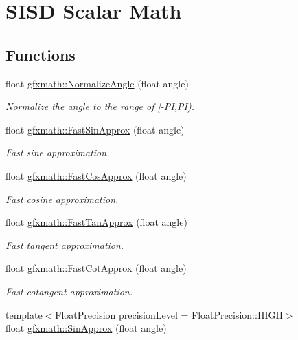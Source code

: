 \hypertarget{group___s_i_s_d_scalar_math}{}\section{S\+I\+S\+D Scalar Math}
\label{group___s_i_s_d_scalar_math}
\subsection*{Functions}
\begin{DoxyCompactItemize}
\item 
float \hyperlink{group___s_i_s_d_scalar_math_ga9ae15ff8e8601f2ed5381a5bce08d289}{gfxmath\+::\+Normalize\+Angle} (float angle)
\begin{DoxyCompactList}\small\item\em Normalize the angle to the range of \mbox{[}-\/\+P\+I,P\+I). \end{DoxyCompactList}\item 
float \hyperlink{group___s_i_s_d_scalar_math_gafb36256c1573aa72d03c3567f955bd83}{gfxmath\+::\+Fast\+Sin\+Approx} (float angle)
\begin{DoxyCompactList}\small\item\em Fast sine approximation. \end{DoxyCompactList}\item 
float \hyperlink{group___s_i_s_d_scalar_math_ga5c9038d14fbd579ef9860351b41fbf95}{gfxmath\+::\+Fast\+Cos\+Approx} (float angle)
\begin{DoxyCompactList}\small\item\em Fast cosine approximation. \end{DoxyCompactList}\item 
float \hyperlink{group___s_i_s_d_scalar_math_gae63b81e8a10d131334205c50b9b2166d}{gfxmath\+::\+Fast\+Tan\+Approx} (float angle)
\begin{DoxyCompactList}\small\item\em Fast tangent approximation. \end{DoxyCompactList}\item 
float \hyperlink{group___s_i_s_d_scalar_math_gab16e2d48a3790c9f448feefe7192dbe1}{gfxmath\+::\+Fast\+Cot\+Approx} (float angle)
\begin{DoxyCompactList}\small\item\em Fast cotangent approximation. \end{DoxyCompactList}\item 
{\footnotesize template$<$Float\+Precision precision\+Level = Float\+Precision\+::\+H\+I\+G\+H$>$ }\\float \hyperlink{group___s_i_s_d_scalar_math_gacf3bf50cb40374d40ffd25e382ca53c8}{gfxmath\+::\+Sin\+Approx} (float angle)

\end{DoxyCompactItemize}
